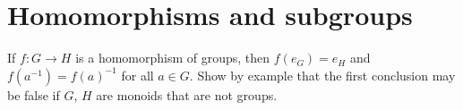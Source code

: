 \section{Homomorphisms and subgroups}
\begin{ex}
    If $f: G \to H$ is a homomorphism of groups, then $f(e_G) = e_H$ and $f(a^{-1}) = f(a)^{-1}$ for all $a \in G$. Show by example that the first conclusion may be false if $G$, $H$ are monoids that are not groups.
\end{ex}